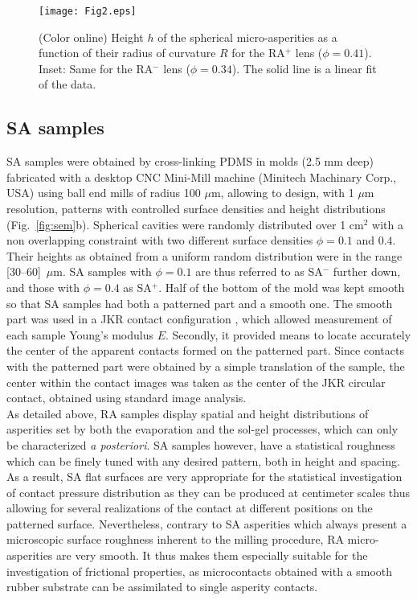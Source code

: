 \documentclass[pre,groupedaddress,showkeys,showpacs,twocolumn]{revtex4}
\begin{document}
%
\begin{figure}
	\texttt{[image: Fig2.eps]}
	\caption{(Color online) Height $h$ of the spherical micro-asperities as a function of their radius of curvature $R$ for the RA$^+$ lens ($\phi=0.41$). Inset: Same for the RA$^-$ lens ($\phi=0.34$). The solid line is a linear fit of the data.}
	\label{fig:h_vs_R} 
\end{figure}
%
\subsection*{SA samples}
SA samples were obtained by cross-linking PDMS in molds (2.5 mm deep) fabricated with a desktop CNC Mini-Mill machine (Minitech Machinary Corp., USA) using ball end mills of radius 100 $\mu$m, allowing to design, with 1 $\mu$m resolution, patterns with controlled surface densities and height distributions (Fig.~\ref{fig:sem}b). Spherical cavities were randomly distributed over 1 cm$^2$ with a non overlapping constraint with two different surface densities $\phi=0.1$ and $0.4$. Their  heights as obtained  from a uniform random distribution were in the range [30--60]~$\mu$m. SA samples with $\phi=0.1$ are thus referred to as SA$^-$ further down, and those with $\phi=0.4$ as SA$^+$. Half of the bottom of the mold was kept smooth so that SA samples had both a patterned part and a smooth one. The smooth part was used in a JKR contact configuration \cite{Johnson1985a}, which allowed measurement of each sample Young's modulus $E$. Secondly, it provided means to locate accurately the center of the apparent contacts 
formed on the 
patterned part. Since contacts with the patterned part were obtained by a simple translation of the sample, the center within the contact images was taken as the center of the JKR circular contact, obtained using standard image analysis.\\

\indent As detailed above, RA samples display spatial and height distributions of asperities set by both the evaporation and the sol-gel processes, which can only be characterized \textit{a posteriori}. SA samples however, have a statistical roughness which can be finely tuned with any desired pattern, both in height and spacing. As a result, SA flat surfaces are very appropriate for the statistical investigation of 
contact pressure distribution as they can be produced at centimeter scales thus allowing for several realizations of the contact at different positions on the patterned surface. Nevertheless, contrary to SA asperities which always present a microscopic surface roughness inherent to the milling procedure, RA micro-asperities are very smooth. It thus makes them especially suitable for the investigation of frictional properties, as microcontacts obtained with a smooth rubber substrate can be assimilated to single asperity contacts.
%
\end{document}
